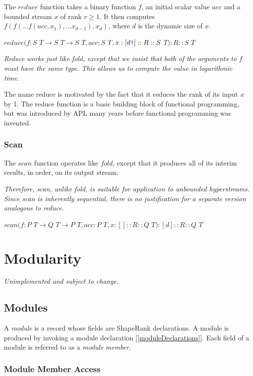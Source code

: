 \documentclass{article}
\begin{document}
The $reduce$ function takes a binary function $f$, an initial scalar value $acc$ and a bounded stream $x$ of rank $r \ge 1$. It then computes
$f(f( \ldots f(acc, x_1), \ldots x_{d-1}), x_d)$, where $d$ is the dynamic size of $x$.

$reduce(f: S $ $T \to{} S $ $T \to{} S $ $T, acc: S $ $T, x:[d\texttt{\color{blue} !}]::R::S $ $T): R::S $ $T$

{\em
Reduce works just like fold, except that we insist that both of the arguments to $f$ must have the same type. This allows us to compute the
value in logarithmic time.

The name reduce is motivated by the fact that it reduces the rank of its input $x$ by 1. The reduce function is a basic building block of functional programming, but was introduced by APL many years before functional programming was invented.
}

\subsubsection{Scan}
\label{scan}

The $scan$ function operates like $fold$, except that it produces all of its interim results, in order, on its output stream. 

{\em 
Therefore, scan, unlike fold, is suitable for application to unbounded hyperstreams. Since scan is inherently sequential, there is no justification for a separate version analogous to reduce.
}

$scan(f: P $ $T \to{} Q $ $T \to{} P $ $T, acc: P $ $T, x:[]::R::Q $ $T):[d]::R::Q $ $T$

\section{Modularity}
\label{modularity}


{\em
Unimplemented and subject to change.
}


\subsection{Modules}
\label{modules}

A {\em module} is a record whose fields are ShapeRank declarations. A module is produced by invoking a module declaration [\ref{moduleDeclarations}].
Each field of a module is referred to as a {\em module member}.

\subsubsection{Module Member Access}
\label{moduleMemberAccess}
\end{document}
